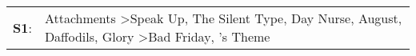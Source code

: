 \begin{supertabular}{p{0.03\textwidth}p{0.92\textwidth}}
 \textbf{S1}:  &  Attachments\textsuperscript{} \textgreater \enspace Speak Up\textsuperscript{}, \enspace The Silent Type\textsuperscript{}, \enspace Day Nurse\textsuperscript{}, \enspace August\textsuperscript{}, \enspace Daffodils\textsuperscript{}, \enspace Glory\textsuperscript{} \textgreater \enspace Bad Friday\textsuperscript{}, 's Theme\textsuperscript{}  \enspace  \\
\end{supertabular}
